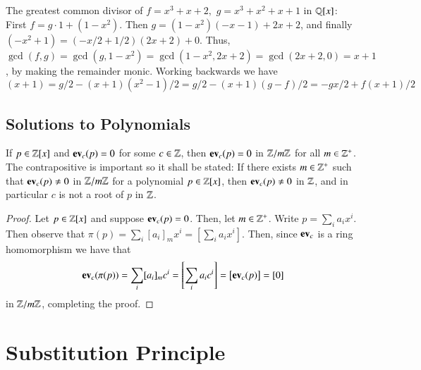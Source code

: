 \documentclass[12pt, a4paper, oneside, openright, titlepage]{book}
\begin{document}
\begin{eg}
    The greatest common divisor of $f = x^3 + x + 2,$ $g = x^3 + x^2 + x + 1$ in $\mathbb Q[x]$: First $f = g\cdot 1 + (1-x^2)$. Then $g = (1-x^2)(-x-1) + 2x+2$, and finally $(-x^2+1) = (-x/2+1/2)(2x+2) + 0$. Thus, $\gcd(f,g) = \gcd(g,1-x^2) = \gcd(1-x^2,2x+2) = \gcd(2x+2,0) = x+1$, by making the remainder monic. Working backwards we have $$(x+1) = g/2 - (x+1)(x^2-1)/2 = g/2 - (x+1)(g-f)/2 = -gx/2+f(x+1)/2$$
\end{eg}


\subsection{\textsection Solutions to Polynomials}

\begin{prop}
    If $p \in \mathbb Z[x]$ and $\operatorname{\bf{ev}}_c(p) = 0$ for some $c \in \mathbb Z$, then $\operatorname{\bf{ev}}_c(p) = 0$ in $\mathbb Z/m\mathbb Z$ for all $m \in \mathbb Z^{+}$. The contrapositive is important so it shall be stated: If there exists $m \in \mathbb Z^{+}$ such that $\operatorname{\bf{ev}}_c(p) \neq 0$ in $\mathbb Z/m\mathbb Z$ for a polynomial $p \in \mathbb Z[x]$, then $\operatorname{\bf{ev}}_c(p) \neq 0$ in $\mathbb Z$, and in particular $c$ is not a root of $p$ in $\mathbb Z$.
    \begin{proof}
        Let $p \in \mathbb Z[x]$ and suppose $\operatorname{\bf{ev}}_c(p) = 0$. Then, let $m \in \mathbb Z^{+}$. Write $p = \sum_ia_ix^i$. Then observe that $\pi(p) = \sum_i[a_i]_mx^i = \left[\sum_ia_ix^i\right]$. Then, since $\operatorname{\bf{ev}}_c$ is a ring homomorphism we have that $$\operatorname{\bf{ev}}_c(\pi(p)) = \sum_i[a_i]_mc^i = \left[\sum_ia_ic^i\right] = \left[\operatorname{\bf{ev}}_c(p)\right] = [0]$$ in $\mathbb Z/m\mathbb Z$, completing the proof.
    \end{proof}
\end{prop}

\section{\textsection Substitution Principle}
\end{document}
